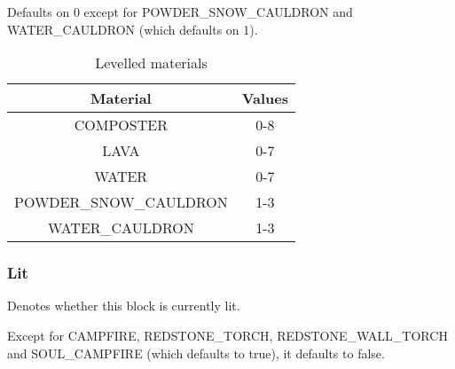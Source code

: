 Defaults on 0 except for POWDER\_SNOW\_CAULDRON and WATER\_CAULDRON (which defaults on 1).

\begin{table}[H]
	\centering
	\begin{tabular}{ |c|c| }
		\hline
		Material & Values \\
		\hline
		COMPOSTER & 0-8 \\
		LAVA & 0-7 \\
		WATER & 0-7 \\
		POWDER\_SNOW\_CAULDRON & 1-3 \\
		WATER\_CAULDRON & 1-3 \\
		\hline
	\end{tabular}
	\caption{Levelled materials}
\end{table}

\subsubsection{Lit}\label{spigot-types:lit}
Denotes whether this block is currently lit.

Except for CAMPFIRE, REDSTONE\_TORCH, REDSTONE\_WALL\_TORCH and SOUL\_CAMPFIRE (which defaults to true), it defaults to false.

